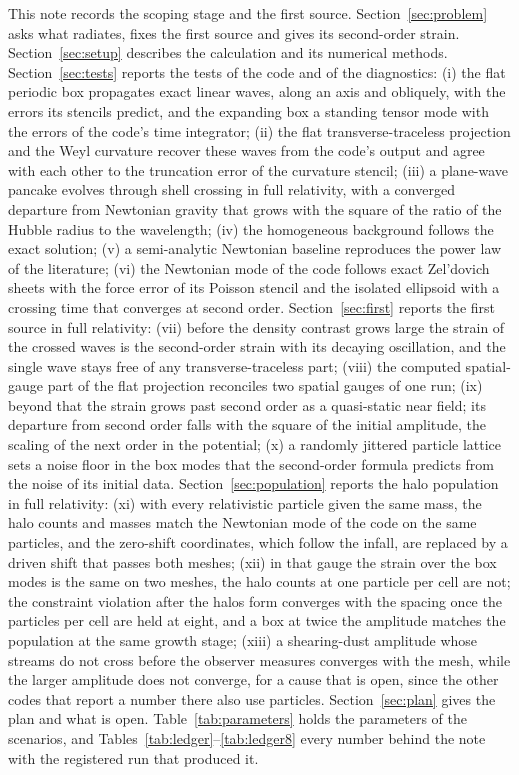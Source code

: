 \documentclass[aps,prd,twocolumn,10pt,superscriptaddress,nofootinbib,longbibliography,floatfix]{revtex4-2}
\begin{document}
This note records the scoping stage and the first source. Section~\ref{sec:problem} asks what radiates, fixes the first source and gives its second-order strain. Section~\ref{sec:setup} describes the calculation and its numerical methods. Section~\ref{sec:tests} reports the tests of the code and of the diagnostics:
(i) the flat periodic box propagates exact linear waves, along an axis and obliquely, with the errors its stencils predict, and the expanding box a standing tensor mode with the errors of the code's time integrator;
(ii) the flat transverse-traceless projection and the Weyl curvature recover these waves from the code's output and agree with each other to the truncation error of the curvature stencil;
(iii) a plane-wave pancake evolves through shell crossing in full relativity, with a converged departure from Newtonian gravity that grows with the square of the ratio of the Hubble radius to the wavelength;
(iv) the homogeneous background follows the exact solution;
(v) a semi-analytic Newtonian baseline reproduces the power law of the literature;
(vi) the Newtonian mode of the code follows exact Zel'dovich sheets with the force error of its Poisson stencil and the isolated ellipsoid with a crossing time that converges at second order.
Section~\ref{sec:first} reports the first source in full relativity:
(vii) before the density contrast grows large the strain of the crossed waves is the second-order strain with its decaying oscillation, and the single wave stays free of any transverse-traceless part;
(viii) the computed spatial-gauge part of the flat projection reconciles two spatial gauges of one run;
(ix) beyond that the strain grows past second order as a quasi-static near field; its departure from second order falls with the square of the initial amplitude, the scaling of the next order in the potential;
(x) a randomly jittered particle lattice sets a noise floor in the box modes that the second-order formula predicts from the noise of its initial data.
Section~\ref{sec:population} reports the halo population in full relativity:
(xi) with every relativistic particle given the same mass, the halo counts and masses match the Newtonian mode of the code on the same particles, and the zero-shift coordinates, which follow the infall, are replaced by a driven shift that passes both meshes;
(xii) in that gauge the strain over the box modes is the same on two meshes, the halo counts at one particle per cell are not; the constraint violation after the halos form converges with the spacing once the particles per cell are held at eight, and a box at twice the amplitude matches the population at the same growth stage;
(xiii) a shearing-dust amplitude whose streams do not cross before the observer measures converges with the mesh, while the larger amplitude does not converge, for a cause that is open, since the other codes that report a number there also use particles.
Section~\ref{sec:plan} gives the plan and what is open. Table~\ref{tab:parameters} holds the parameters of the scenarios, and Tables~\ref{tab:ledger}--\ref{tab:ledger8} every number behind the note with the registered run that produced it.
\end{document}
